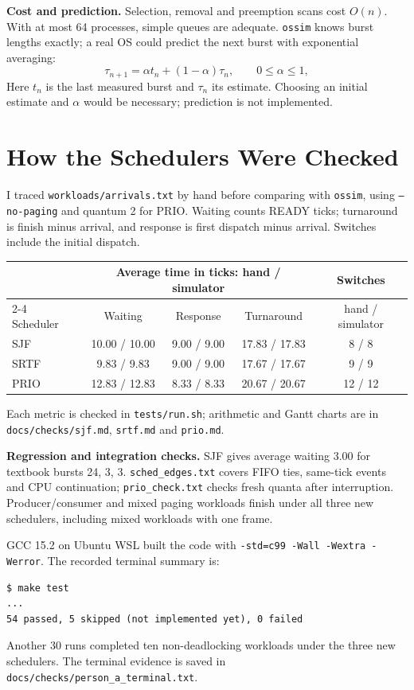 \documentclass[11pt,a4paper]{article}
\newcommand{\code}[1]{\texttt{#1}}
\begin{document}
\textbf{Cost and prediction.}
Selection, removal and preemption scans cost \(O(n)\). With at most 64
processes, simple queues are adequate. \code{ossim} knows burst lengths
exactly; a real OS could predict the next burst with exponential averaging:
\[
  \tau_{n+1}=\alpha t_n+(1-\alpha)\tau_n,
  \qquad 0\leq\alpha\leq1,
\]
Here \(t_n\) is the last measured burst and \(\tau_n\) its estimate.
Choosing an initial estimate and \(\alpha\) would be necessary; prediction
is not implemented.

\newpage
\section{How the Schedulers Were Checked}

I traced \code{workloads/arrivals.txt} by hand before comparing with
\code{ossim}, using \code{--no-paging} and quantum 2 for PRIO.
Waiting counts READY ticks; turnaround is finish minus arrival, and
response is first dispatch minus arrival. Switches include the initial
dispatch.

\begin{center}
{\small
\begin{tabular}{@{}lcccc@{}}
\toprule
 & \multicolumn{3}{c}{Average time in ticks: hand / simulator} & Switches \\
\cmidrule(lr){2-4}
Scheduler & Waiting & Response & Turnaround & hand / simulator \\
\midrule
SJF & 10.00 / 10.00 & 9.00 / 9.00 & 17.83 / 17.83 & 8 / 8 \\
SRTF & 9.83 / 9.83 & 9.00 / 9.00 & 17.67 / 17.67 & 9 / 9 \\
PRIO & 12.83 / 12.83 & 8.33 / 8.33 & 20.67 / 20.67 & 12 / 12 \\
\bottomrule
\end{tabular}}
\end{center}

Each metric is checked in \code{tests/run.sh}; arithmetic and Gantt charts
are in \code{docs/checks/sjf.md}, \code{srtf.md} and \code{prio.md}.

\textbf{Regression and integration checks.}
SJF gives average waiting 3.00 for textbook bursts 24, 3, 3.
\code{sched\_edges.txt} covers FIFO ties, same-tick events and CPU
continuation; \code{prio\_check.txt} checks fresh quanta after interruption.
Producer/consumer and mixed paging workloads finish under all three
new schedulers, including mixed workloads with one frame.

GCC 15.2 on Ubuntu WSL built the code with
\code{-std=c99 -Wall -Wextra -Werror}. The recorded terminal summary is:
{\small
\begin{verbatim}
$ make test
...
54 passed, 5 skipped (not implemented yet), 0 failed
\end{verbatim}}
Another 30 runs completed ten non-deadlocking workloads under the three
new schedulers. The terminal evidence is saved in
\code{docs/checks/person\_a\_terminal.txt}.
\end{document}
